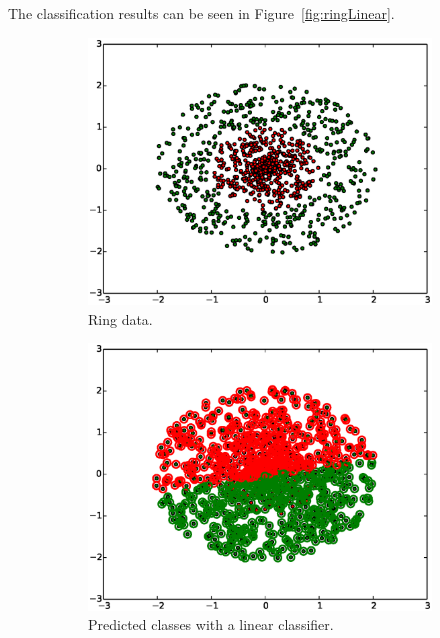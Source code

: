 \documentclass[a4paper,10pt]{article}
\begin{document}
The classification results can be seen in Figure~\ref{fig:ringLinear}.

\begin{figure}[ht!]
    \centering
    \begin{subfigure}{.49\textwidth}
    \includegraphics[width=1.00\textwidth]{ringData.eps}
    \caption{Ring data.}
    \end{subfigure}
    \begin{subfigure}{.49\textwidth}
    \includegraphics[width=1.00\textwidth]{ringLinearFit.eps}
    \caption{Predicted classes with a linear classifier.}
    \end{subfigure}
    \begin{subfigure}{.49\textwidth}

\end{subfigure}
\end{figure}
\end{document}
